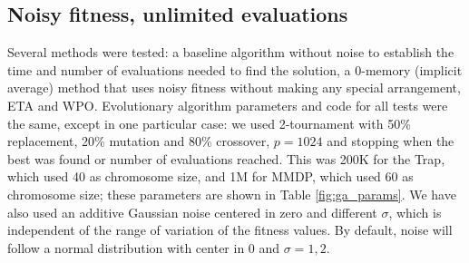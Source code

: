 \documentclass{llncs}
\begin{document}
\subsection{Noisy fitness, unlimited evaluations}
\label{ss:unlimited}

Several methods were tested: a baseline algorithm without
noise to establish the time and number of evaluations
needed to find the solution, a 0-memory (implicit average) method that
uses noisy fitness without making any special arrangement, ETA and
WPO. Evolutionary algorithm parameters and code for all tests were the
same, except in one
particular case: we used 2-tournament with 50\% replacement, 20\%
mutation and 80\% crossover, $p=1024$ and stopping when the best was
found or number of evaluations reached. This was 200K for the Trap,
which used 40 as chromosome size, and 1M for MMDP, which used 60 as
chromosome size; these parameters are shown in Table \ref{fig:ga_params}. We have also used an additive Gaussian noise centered in zero
and different $\sigma$, which is independent of the range of variation
of the fitness values. By default, noise will follow a normal
distribution with center in 0 and $\sigma=1,2$. 
\end{document}
